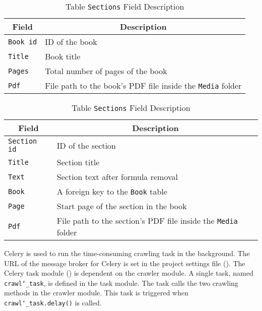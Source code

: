 \begin{table}[!htbp]
\begingroup
\renewcommand{\arraystretch}{1.2}
\caption{Field Description for Crawled Document Data}
\label{tbl:crawl_data}

\begin{subtable}{\textwidth}
\centering
\caption{Table \texttt{Books} Field Description}
\begin{tabular}{p{3cm} p{9cm}}
\toprule
\multicolumn{1}{c}{\textbf{Field}} & \multicolumn{1}{c}{\textbf{Description}} \\
\midrule
\texttt{Book id} & ID of the book \\
\texttt{Title} & Book title \\
\texttt{Pages} & Total number of pages of the book \\
\texttt{Pdf} & File path to the book's PDF file inside the \texttt{Media} folder \\
\bottomrule       
\end{tabular}
\end{subtable}

\begin{subtable}{\textwidth}
\centering
\caption{Table \texttt{Sections} Field Description}
\begin{tabular}{p{3cm} p{9cm}}
\toprule
\multicolumn{1}{c}{\textbf{Field}} & \multicolumn{1}{c}{\textbf{Description}} \\
\midrule
\texttt{Section id} & ID of the section \\
\texttt{Title} & Section title \\
\texttt{Text} & Section text after formula removal \\
\texttt{Book} & A foreign key to the \texttt{Book} table\\
\texttt{Page} & Start page of the section in the book  \\
\texttt{Pdf} & File path to the section's PDF file inside the \texttt{Media} folder \\
\bottomrule       
\end{tabular}
\end{subtable}

\endgroup
\end{table}

Celery is used to run the time-consuming crawling task in the background. The URL of the message broker for Celery is set in the project settings file (). The Celery task module () is dependent on the crawler module. A single task, named \texttt{crawl\char`_task}, is defined in the task module. The task calls the two crawling methods in the crawler module. This task is triggered when \texttt{crawl\char`_task.delay()} is called.

